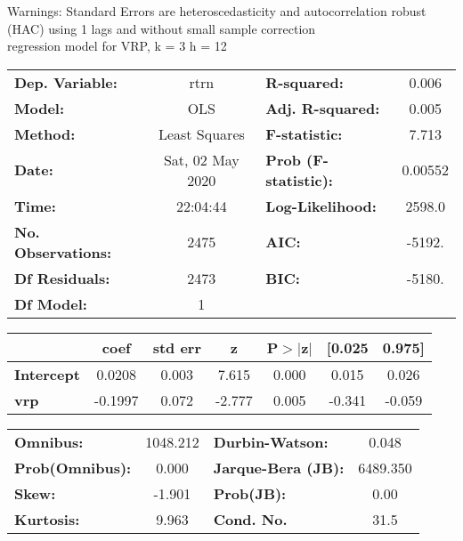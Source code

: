 Warnings: \newline
 [1] Standard Errors are heteroscedasticity and autocorrelation robust (HAC) using 1 lags and without small sample correction\\ 

regression model for VRP, k = 3 h = 12\begin{center}
\begin{tabular}{lclc}
\toprule
\textbf{Dep. Variable:}    &       rtrn       & \textbf{  R-squared:         } &     0.006   \\
\textbf{Model:}            &       OLS        & \textbf{  Adj. R-squared:    } &     0.005   \\
\textbf{Method:}           &  Least Squares   & \textbf{  F-statistic:       } &     7.713   \\
\textbf{Date:}             & Sat, 02 May 2020 & \textbf{  Prob (F-statistic):} &  0.00552    \\
\textbf{Time:}             &     22:04:44     & \textbf{  Log-Likelihood:    } &    2598.0   \\
\textbf{No. Observations:} &        2475      & \textbf{  AIC:               } &    -5192.   \\
\textbf{Df Residuals:}     &        2473      & \textbf{  BIC:               } &    -5180.   \\
\textbf{Df Model:}         &           1      & \textbf{                     } &             \\
\bottomrule
\end{tabular}
\begin{tabular}{lcccccc}
                   & \textbf{coef} & \textbf{std err} & \textbf{z} & \textbf{P$> |$z$|$} & \textbf{[0.025} & \textbf{0.975]}  \\
\midrule
\textbf{Intercept} &       0.0208  &        0.003     &     7.615  &         0.000        &        0.015    &        0.026     \\
\textbf{vrp}       &      -0.1997  &        0.072     &    -2.777  &         0.005        &       -0.341    &       -0.059     \\
\bottomrule
\end{tabular}
\begin{tabular}{lclc}
\textbf{Omnibus:}       & 1048.212 & \textbf{  Durbin-Watson:     } &    0.048  \\
\textbf{Prob(Omnibus):} &   0.000  & \textbf{  Jarque-Bera (JB):  } & 6489.350  \\
\textbf{Skew:}          &  -1.901  & \textbf{  Prob(JB):          } &     0.00  \\
\textbf{Kurtosis:}      &   9.963  & \textbf{  Cond. No.          } &     31.5  \\
\bottomrule
\end{tabular}
\end{center}


